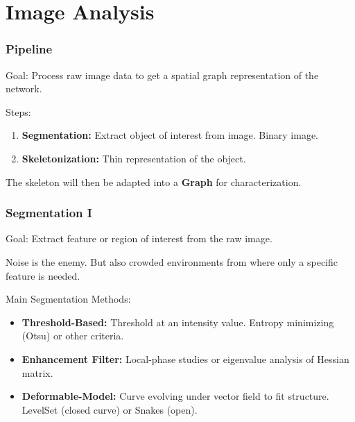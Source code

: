 \documentclass[9pt]{beamer}
\begin{document}
\section{Image Analysis}
\begin{frame}[t]
  \frametitle{Pipeline}
    \begin{alertblock}{Goal:}
        Process raw image data to get a spatial graph representation of the network.
    \end{alertblock}
    \vspace{0.8cm}
    \begin{exampleblock}{Steps:}
      \begin{enumerate}
        \item \textbf{Segmentation:} Extract object of interest from image. Binary image.
        \item \textbf{Skeletonization:} Thin representation of the object.
      \end{enumerate}
    \end{exampleblock}
    \vspace{1cm}
    The skeleton will then be adapted into a \textbf{Graph} for characterization.
\end{frame}

\begin{frame}[t]
  \frametitle{Segmentation I}
    \alert{Goal:} Extract feature or region of interest from the raw image.

     Noise is the enemy.
     But also crowded environments from where only a specific feature is needed.

     \vspace{0.8cm}
     \begin{exampleblock}{Main Segmentation Methods:}
       \begin{itemize}
         \item \textbf{Threshold-Based:} Threshold at an intensity value. Entropy minimizing (Otsu) or other criteria.
         \item \textbf{Enhancement Filter:} Local-phase studies or eigenvalue analysis of Hessian matrix.
         \item \textbf{Deformable-Model:} Curve evolving under vector field to fit structure. LevelSet (closed curve) or Snakes (open).
       \end{itemize}
     \end{exampleblock}
\end{frame}
\end{document}
